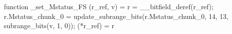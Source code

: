 function _set_Mstatus_FS (r_ref, v) = {
    r = __bitfield_deref(r_ref);
    r.Mstatus_chunk_0 = update_subrange_bits(r.Mstatus_chunk_0, 14, 13, subrange_bits(v, 1, 0));
    (*r_ref) = r
}
